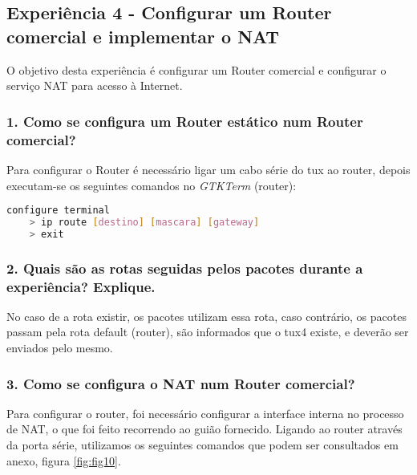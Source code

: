 \subsection*{Experiência 4 - Configurar um Router comercial e implementar o NAT}
O objetivo desta experiência é configurar um Router comercial e configurar o serviço NAT para acesso à Internet.

\subsubsection{1. Como se configura um Router estático num Router comercial?}
Para configurar o Router é necessário ligar um cabo série do tux ao router, depois executam-se os seguintes comandos no \emph{GTKTerm} (router):

\begin{lstlisting}[language=bash]
	configure terminal
	> ip route [destino] [mascara] [gateway]
	> exit
\end{lstlisting}

\subsubsection{2. Quais são as rotas seguidas pelos pacotes durante a experiência? Explique.}
No caso de a rota existir, os pacotes utilizam essa rota, caso contrário, os pacotes passam pela rota default (router), são informados que o tux4 existe, e deverão ser enviados pelo mesmo.

\subsubsection{3. Como se configura o NAT num Router comercial?}
Para configurar o router, foi necessário configurar a interface interna no processo de NAT, o que foi feito recorrendo ao guião fornecido. Ligando ao router através da porta série, utilizamos os seguintes comandos que podem ser consultados em anexo, figura \ref{fig:fig10}.

